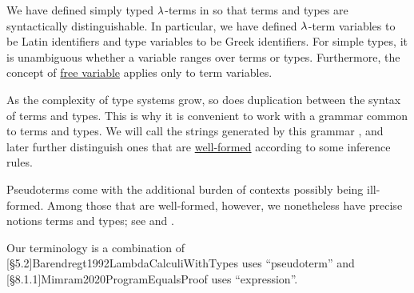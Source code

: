 \begin{concept}\label{con:pseudoterm_expression}\mimprovised
  We have defined simply typed \( {\mathrm \lambda} \)-terms in  so that terms and types are syntactically distinguishable. In particular, we have defined \( {\mathrm \lambda} \)-term variables to be Latin identifiers and type variables to be Greek identifiers. For simple types, it is unambiguous whether a variable ranges over terms or types. Furthermore, the concept of \hyperref[con:variable_dependence]{free variable} applies only to term variables.

  As the complexity of type systems grow, so does duplication between the syntax of terms and types. This is why it is convenient to work with a grammar common to terms and types. We will call the strings generated by this grammar , and later further distinguish ones that are \hyperref[rem:well_formed_context]{well-formed} according to some inference rules.
\end{concept}
\begin{comments}
  \item Pseudoterms come with the additional burden of contexts possibly being ill-formed. Among those that are well-formed, however, we nonetheless have precise notions terms and types; see  and .

  \item Our terminology is a combination of [\S 5.2]{Barendregt1992LambdaCalculiWithTypes} uses \enquote{pseudoterm} and [\S 8.1.1]{Mimram2020ProgramEqualsProof} uses \enquote{expression}.
\end{comments}

